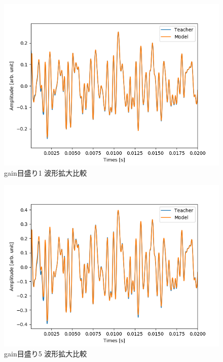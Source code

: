 \documentclass{jreport}		%
\begin{document}
\begin{figure}[htbp]
 \begin{center}
  \includegraphics[width=150mm]{gain1_output_hikaku.png}
 \end{center}
 \caption{gain目盛り1 波形拡大比較}
 \label{fig:one}
\end{figure}

\begin{figure}[htbp]
 \begin{center}
  \includegraphics[width=150mm]{gain5_output_hikaku.png}
 \end{center}
 \caption{gain目盛り5 波形拡大比較}
 \label{fig:one}
\end{figure}
\end{document}
